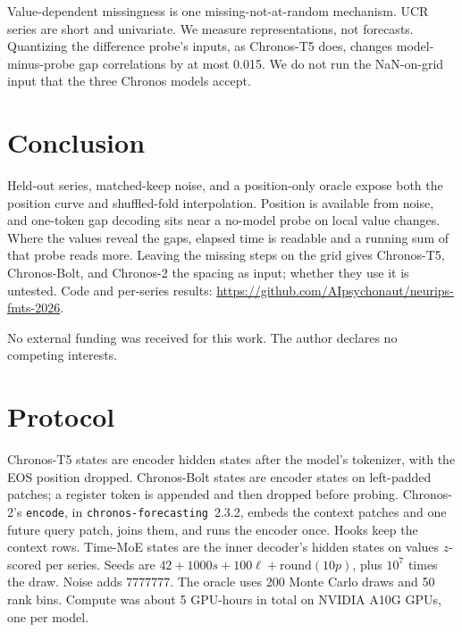 \documentclass{article}
\begin{document}
Value-dependent missingness is one missing-not-at-random mechanism.
UCR series are short and univariate.
We measure representations, not forecasts.
Quantizing the difference probe's inputs, as Chronos-T5 does, changes model-minus-probe gap correlations by at most 0.015.
We do not run the NaN-on-grid input that the three Chronos models accept.

\section{Conclusion}
\label{sec:conc}

Held-out series, matched-keep noise, and a position-only oracle expose both the position curve and shuffled-fold interpolation.
Position is available from noise, and one-token gap decoding sits near a no-model probe on local value changes.
Where the values reveal the gaps, elapsed time is readable and a running sum of that probe reads more.
Leaving the missing steps on the grid gives Chronos-T5, Chronos-Bolt, and Chronos-2 the spacing as input; whether they use it is untested.
Code and per-series results: \url{https://github.com/AIpsychonaut/neurips-fmts-2026}.

\begin{ack}
No external funding was received for this work.
The author declares no competing interests.
\end{ack}

{\small


}

\appendix

\section{Protocol}
\label{app:protocol}

Chronos-T5 states are encoder hidden states after the model's tokenizer, with the EOS position dropped.
Chronos-Bolt states are encoder states on left-padded patches; a register token is appended and then dropped before probing.
Chronos-2's \texttt{encode}, in \texttt{chronos-forecasting}~2.3.2, embeds the context patches and one future query patch, joins them, and runs the encoder once.
Hooks keep the context rows.
Time-MoE states are the inner decoder's hidden states on values $z$-scored per series.
Seeds are $42 + 1000s + 100\ell + \mathrm{round}(10p)$, plus $10^{7}$ times the draw.
Noise adds $7777777$.
The oracle uses 200 Monte Carlo draws and 50 rank bins.
Compute was about 5 GPU-hours in total on NVIDIA A10G GPUs, one per model.
\end{document}
